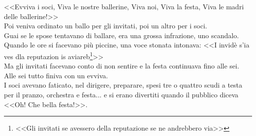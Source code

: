 \indent <<Evviva i soci, Viva le nostre ballerine, Viva noi, Viva la festa, Viva le madri delle ballerine!>>\\
\indent Poi veniva ordinato un ballo per gli invitati, poi un altro per i soci.\\
\indent Guai se le spose tentavano di ballare, era una grossa infrazione, uno scandalo.\\
\indent Quando le ore si facevano più piccine, una voce stonata intonava: <<I invidè s'ia ves dla reputazion is aviareb\footnote{<<Gli invitati se avessero della reputazione se ne andrebbero via>>}>>\\
\indent Ma gli invitati facevano conto di non sentire e la festa continuava fino alle sei. Alle sei tutto finiva con un evviva.\\
\indent I soci avevano faticato, nel dirigere, preparare, spesi tre o quattro scudi a testa per il pranzo, orchestra e festa... e si erano divertiti quando il pubblico diceva <<Oh! Che bella festa!>>.

